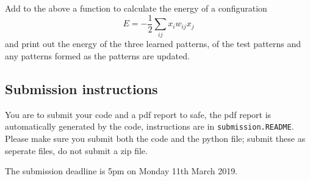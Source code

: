 \documentclass[12pt]{article}
\begin{document}
Add to the above a function to calculate the energy of a configuration
\begin{equation}
E=-\frac{1}{2}\sum_{ij} x_i w_{ij} x_j
\end{equation}
and print out the energy of the three learned patterns, of the test
patterns and any patterns formed as the patterns are updated.

\subsection*{Submission instructions}

You are to submit your code and a pdf report to safe, the pdf report
is automatically generated by the code, instructions are in
\texttt{submission.README}. Please make sure you submit both the code
and the python file; submit these as seperate files, do not submit a
zip file.

The submission deadline is 5pm on Monday 11th March 2019.
\end{document}
